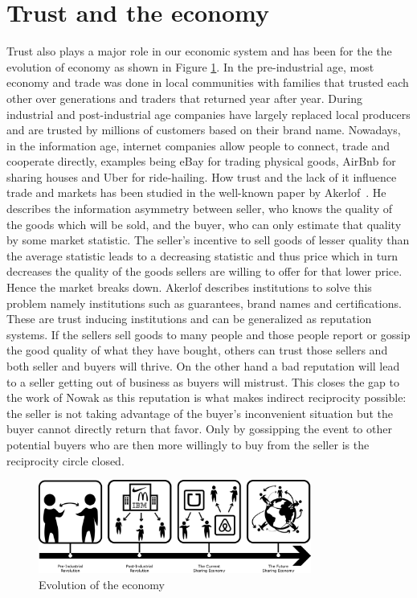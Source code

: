 \section{Trust and the economy}
Trust also plays a major role in our economic system and has been for the the evolution of economy 
as shown in Figure \ref{fig:economy}. In the pre-industrial age, most economy and trade was done in local
communities with families that trusted each other over generations and traders that returned year
after year. During industrial and post-industrial age companies have largely replaced local 
producers and are trusted by millions of customers based on their brand name. Nowadays, in the 
information age, internet companies allow people to connect, trade and cooperate directly, examples
being eBay for trading physical goods, AirBnb for sharing houses and Uber for ride-hailing. How trust
and the lack of it influence trade and markets has been studied in the well-known paper by 
Akerlof~\cite{akerlof1970lemons}. He describes the information asymmetry between seller, who knows
the quality of the goods which will be sold, and the buyer, who can only estimate that quality by 
some market statistic. The seller's incentive to sell goods of lesser quality than the average 
statistic leads to a decreasing statistic and thus price which in turn decreases the quality of the 
goods sellers are willing to offer for that lower price. Hence the market breaks down. Akerlof
describes institutions to solve this problem namely institutions such as guarantees, brand names and
certifications. These are trust inducing institutions and can be generalized as reputation systems.
If the sellers sell goods to many people and those people report or gossip the good quality of what
they have bought, others can trust those sellers and both seller and buyers will thrive. On the 
other hand a bad reputation will lead to a seller getting out of business as buyers will mistrust.
This closes the gap to the work of Nowak as this reputation is what makes indirect reciprocity
possible: the seller is not taking advantage of the buyer's inconvenient situation but the buyer
cannot directly return that favor. Only by gossipping the event to other potential buyers who are 
then more willingly to buy from the seller is the reciprocity circle closed.~\cite{nowak2006five}

\begin{figure}[t]
    \centering
    \includegraphics[width=0.8\textwidth]{images/economy.png}
    \caption{Evolution of the economy}
    \label{fig:economy}
\end{figure}

